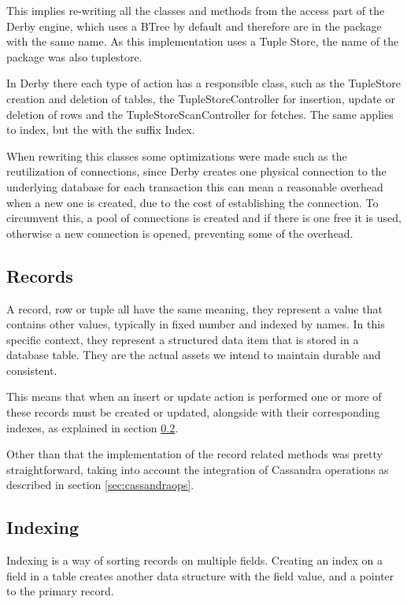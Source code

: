 This implies re-writing all the classes and methods from the access part of the Derby engine, which uses a BTree by default and therefore are in the package with the same name. As this implementation uses a Tuple Store, the name of the package was also tuplestore.

In Derby there each type of action has a responsible class, such as the TupleStore creation and deletion of tables, the TupleStoreController for insertion, update or deletion of rows and the TupleStoreScanController for fetches. The same applies to index, but the with the suffix Index.

When rewriting this classes some optimizations were made such as the reutilization of connections, since Derby creates one physical connection to the underlying database for each transaction this can mean a reasonable overhead when a new one is created, due to the cost of establishing the connection. To circumvent this, a pool of connections is created and if there is one free it is used, otherwise a new connection is opened, preventing some of the overhead. 

\subsection{Records}
A record, row or tuple all have the same meaning, they represent a value that contains other values, typically in fixed number and indexed by names. In this specific context, they represent a structured data item that is stored in a database table. They are the actual assets we intend to maintain durable and consistent.

This means that when an insert or update action is performed one or more of these records must be created or updated, alongside with their corresponding indexes, as explained in section \ref{sec:derby_index}.

Other than that the implementation of the record related methods was pretty straightforward, taking into account the integration of Cassandra operations as described in section \ref{sec:cassandraops}.

\subsection{Indexing}
\label{sec:derby_index}
Indexing is a way of sorting records on multiple fields. Creating an index on a field in a table creates another data structure with the field value, and a pointer to the primary record. 

